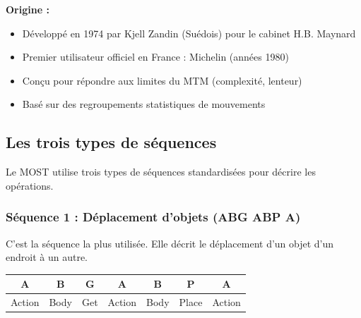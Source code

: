 \documentclass[a4paper,12pt]{article}
\begin{document}
\textbf{Origine :}
\begin{itemize}
    \item Développé en 1974 par Kjell Zandin (Suédois) pour le cabinet H.B. Maynard
    \item Premier utilisateur officiel en France : Michelin (années 1980)
    \item Conçu pour répondre aux limites du MTM (complexité, lenteur)
    \item Basé sur des regroupements statistiques de mouvements
\end{itemize}

\begin{center}
\end{center}

\subsection{Les trois types de séquences}

Le MOST utilise trois types de séquences standardisées pour décrire les opérations.

\subsubsection{Séquence 1 : Déplacement d'objets (ABG ABP A)}

C'est la séquence la plus utilisée. Elle décrit le déplacement d'un objet d'un endroit à un autre.

\begin{center}
\begin{tabular}{|c|c|c|c|c|c|c|}
\hline
\textbf{A} & \textbf{B} & \textbf{G} & \textbf{A} & \textbf{B} & \textbf{P} & \textbf{A} \\
\hline
Action & Body & Get & Action & Body & Place & Action \\
\hline
\end{tabular}
\caption*{Structure de la séquence 1 : ABG ABP A}
\end{center}
\end{document}
